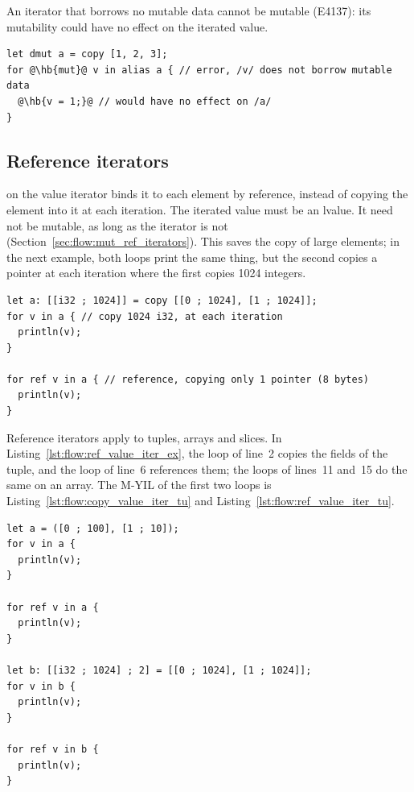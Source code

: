 An iterator that borrows no mutable data cannot be mutable (E4137): its
mutability could have no effect on the iterated value.

\begin{lstlisting}[style=coloredverbatimError, escapechar=@, caption=Useless mutable iterator, label=lst:flow:useless_mut_iterator]
let dmut a = copy [1, 2, 3];
for @\hb{mut}@ v in alias a { // error, /v/ does not borrow mutable data
  @\hb{v = 1;}@ // would have no effect on /a/
}
\end{lstlisting}

\subsection{Reference iterators}

 on the value iterator binds it to each element by reference, instead
of copying the element into it at each iteration. The iterated value must be an
lvalue. It need not be mutable, as long as the iterator is not
(Section~\ref{sec:flow:mut_ref_iterators}). This saves the copy of large
elements; in the next example, both loops print the same thing, but the second
copies a pointer at each iteration where the first copies 1024 integers.

\begin{lstlisting}[style=coloredverbatim, escapechar=@]
let a: [[i32 ; 1024]] = copy [[0 ; 1024], [1 ; 1024]];
for v in a { // copy 1024 i32, at each iteration
  println(v);
}

for ref v in a { // reference, copying only 1 pointer (8 bytes)
  println(v);
}
\end{lstlisting}

Reference iterators apply to tuples, arrays and slices. In
Listing~\ref{lst:flow:ref_value_iter_ex}, the loop of line~2 copies the fields of
the tuple, and the loop of line~6 references them; the loops of lines~11 and~15
do the same on an array. The M-YIL of the first two loops is
Listing~\ref{lst:flow:copy_value_iter_tu} and
Listing~\ref{lst:flow:ref_value_iter_tu}.

\begin{lstlisting}[style=coloredverbatim, caption=iteration using reference value iterator, label=lst:flow:ref_value_iter_ex]
let a = ([0 ; 100], [1 ; 10]);
for v in a {
  println(v);
}

for ref v in a {
  println(v);
}

let b: [[i32 ; 1024] ; 2] = [[0 ; 1024], [1 ; 1024]];
for v in b {
  println(v);
}

for ref v in b {
  println(v);
}
\end{lstlisting}

